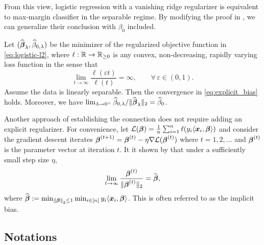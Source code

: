 From this view, logistic regression with a vanishing ridge regularizer is equivalent to max-margin classifier in the separable regime. By modifying the proof in \cite{rosset2003margin}, we can generalize their conclusion with $\beta_0$ included.
\begin{prop}\label{prop:explicit_bias}
    Let $(\widehat{{\boldsymbol{\beta}}}_\lambda, \widehat\beta_{0,\lambda})$ be the minimizer of the regularized objective function in \cref{eq:logistic-l2}, where $\ell: \mathbb{R} \to \mathbb{R}_{\ge 0}$ is any convex, non-decreasing, rapidly varying loss function in the sense that
    \begin{equation*}
        \lim_{t \to \infty} \frac{\ell(\varepsilon t)}{\ell(t)} = \infty, \qquad \forall\, \varepsilon \in (0, 1).
    \end{equation*}
    Assume the data is linearly separable. 
    Then the convergence in \cref{eq:explicit_bias} holds. Moreover, we have $\lim_{\lambda \to 0^+} \widehat\beta_{0,\lambda}/\| \widehat {{\boldsymbol{\beta}}}_\lambda \|_2 = \widehat\beta_{0}$.
\end{prop}

Another approach of establishing the connection does not require adding an explicit regularizer. 
For convenience, let 
$\mathcal{L}({\boldsymbol{\beta}}) = \frac1n\sum_{i=1}^n \ell( y_i \langle {\boldsymbol{x}}_i, {\boldsymbol{\beta}} \rangle )$ and
consider the gradient descent iterates ${\boldsymbol{\beta}}^{(t+1)} = {\boldsymbol{\beta}}^{(t)} - \eta \nabla \mathcal{L}({\boldsymbol{\beta}}^{(t)})$ where $t=1,2,\ldots$ and 
${\boldsymbol{\beta}}^{(t)}$ is the parameter vector at iteration $t$. It it shown by \cite{Soudry_implicit_bias} that under a sufficiently small step size $\eta$, 
\begin{equation*}
    \lim\limits_{t\to\infty}\frac{{\boldsymbol{\beta}}^{(t)}}{\| {\boldsymbol{\beta}}^{(t)} \|_2} = \widehat {{\boldsymbol{\beta}}},
\end{equation*}
where $\widehat{{\boldsymbol{\beta}}} := \min_{\left\|{{\boldsymbol{\beta}}}\right\|_2 \le 1} \min_{i \in [n]} y_i\langle \text{\boldmath $x$}_i, {\boldsymbol{\beta}} \rangle$. This is often referred to as the implicit bias.


\subsection{Notations}

